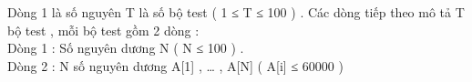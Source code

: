 Dòng 1 là số nguyên T là số bộ test ( 1 ≤ T ≤ 100 ) . Các dòng tiếp theo mô tả T bộ test , mỗi bộ test gồm 2 dòng :
\\Dòng 1 : Số nguyên dương N ( N ≤ 100 ) .
\\Dòng 2 : N số nguyên dương A[1] , … , A[N] ( A[i] ≤ 60000 )

\
